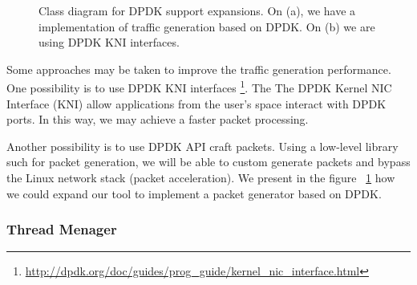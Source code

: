 \begin{figure}[h!]
	\centering
	\hspace{0mm}
	\caption{Class diagram for DPDK support expansions. On (a), we have a implementation of traffic generation based on DPDK. On (b) we are using DPDK KNI interfaces.}
	\label{fig:DpdkFlow}
\end{figure}

Some approaches may be taken to improve the traffic generation performance. One possibility is to use DPDK KNI interfaces \footnote{\href{http://dpdk.org/doc/guides/prog_guide/kernel_nic_interface.html}{http://dpdk.org/doc/guides/prog\_guide/kernel\_nic\_interface.html}}. The The DPDK Kernel NIC Interface (KNI) allow applications from the user's space interact with DPDK ports. In this way, we may achieve a faster packet processing. 

Another possibility is to use DPDK API craft packets. Using a low-level library such for packet generation, we will be able to custom generate packets and bypass the Linux network stack (packet acceleration). We present in the figure ~\ref{fig:DpdkFlow} how we could expand our tool to implement a packet generator based on DPDK.


\subsubsection{Thread Menager}

